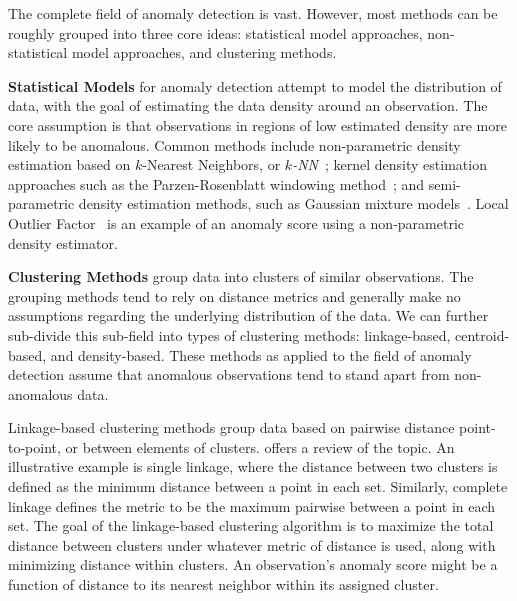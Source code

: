 
The complete field of anomaly detection is vast.  However, most methods can be 
    roughly grouped into three core ideas: statistical model approaches, 
    non-statistical model approaches, and clustering methods.
    
{\bf Statistical Models} for anomaly detection attempt to model the distribution 
    of data, with the goal of estimating the data density around an observation. 
    The core assumption is that observations in regions of low estimated density 
    are more likely to be anomalous.  Common methods include non-parametric 
    density estimation based on $k$-Nearest Neighbors, or 
    \emph{$k$-NN}~\citep{kramer2013}; kernel density estimation approaches such 
    as the Parzen-Rosenblatt windowing method~\citep{parzen1962,rosenblatt1956}; 
    and semi-parametric density estimation methods, such as Gaussian mixture 
    models~\citep{mcnicholas2010}.  Local Outlier Factor~\cite{breunig2000} is 
    an example of an anomaly score using a non-parametric density estimator.

{\bf Clustering Methods} group data into clusters of similar observations.
    The grouping methods tend to rely on distance metrics and generally make no 
    assumptions regarding the underlying distribution of the data.  We can 
    further sub-divide this sub-field into types of clustering methods: 
    linkage-based, centroid-based, and density-based. These methods as applied 
    to the field of anomaly detection assume that anomalous observations tend 
    to stand apart from non-anomalous data.  
    
Linkage-based clustering methods group data based on pairwise distance 
    point-to-point, or between elements of clusters.  \cite{ackerman2010} offers
    a review of the topic.  An illustrative example is single linkage, where 
    the distance between two clusters is defined as the minimum distance 
    between a point in each set.   Similarly, complete linkage defines the 
    metric to be the maximum pairwise between a point in each set.  The goal of 
    the linkage-based clustering algorithm is to maximize the total distance 
    between clusters under whatever metric of distance is used, along with 
    minimizing distance within clusters.  An observation's anomaly score might 
    be a function of distance to its nearest neighbor within its assigned 
    cluster.

